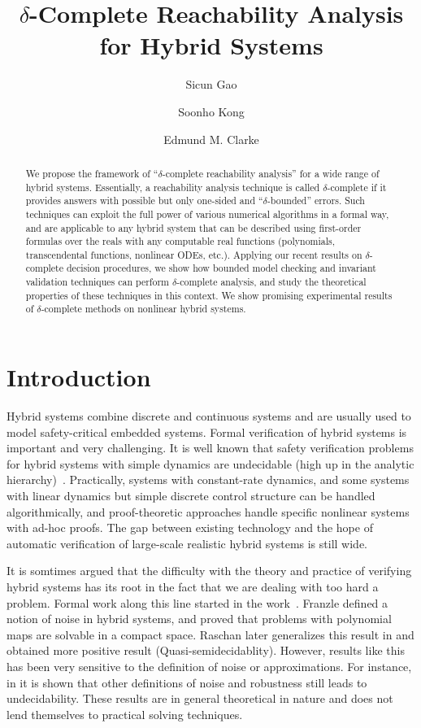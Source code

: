 \documentclass[envcountsect]{llncs}
\title{$\delta$-Complete Reachability Analysis for Hybrid Systems}
\author{Sicun Gao \and Soonho Kong \and Edmund M. Clarke}
\institute{Carnegie Mellon University, Pittsburgh, PA 15213}
\begin{document}
\maketitle

\begin{abstract}
We propose the framework of ``$\delta$-complete reachability analysis'' for a
wide range of hybrid systems. Essentially, a reachability analysis technique is
called $\delta$-complete if it provides answers with possible but only
one-sided and ``$\delta$-bounded'' errors. Such techniques can exploit the full
power of various numerical algorithms in a formal way, and are applicable to any
hybrid system that can be described using first-order formulas over the reals
with any computable real functions (polynomials, transcendental functions,
nonlinear ODEs, etc.). Applying our recent results on $\delta$-complete decision
procedures, we show how bounded model checking and invariant validation
techniques can perform $\delta$-complete analysis, and study the theoretical
properties of these techniques in this context. We show promising experimental
results of $\delta$-complete methods on nonlinear hybrid systems. 
\end{abstract}

\section{Introduction}

Hybrid systems combine discrete and continuous systems and are usually used to
model safety-critical embedded systems. Formal verification of hybrid systems is
important and very challenging. It is well known that safety verification
problems for hybrid systems with simple dynamics are undecidable (high up in the
analytic hierarchy)~\cite{}. Practically, systems with constant-rate dynamics,
and some systems with linear dynamics but simple discrete control structure can
be handled algorithmically, and proof-theoretic approaches handle specific
nonlinear systems with ad-hoc proofs. The gap between existing technology and
the hope of automatic verification of large-scale realistic hybrid systems is
still wide. 

It is somtimes argued that the difficulty with the theory and practice
of verifying hybrid systems has its root in the fact that we are dealing with
too hard a problem. Formal work along this line started in the work~\cite{}.
Franzle defined a notion of noise in hybrid systems, and proved that problems
with polynomial maps are solvable in a compact space. Raschan later generalizes
this result in \cite{} and obtained more positive result
(Quasi-semidecidablity). However, results like this has been very sensitive to
the definition of noise or approximations. For instance, in \cite{} it is shown
that other definitions of noise and robustness still leads to undecidability.
These results are in general theoretical in nature and does not lend themselves
to practical solving techniques. 
\end{document}
